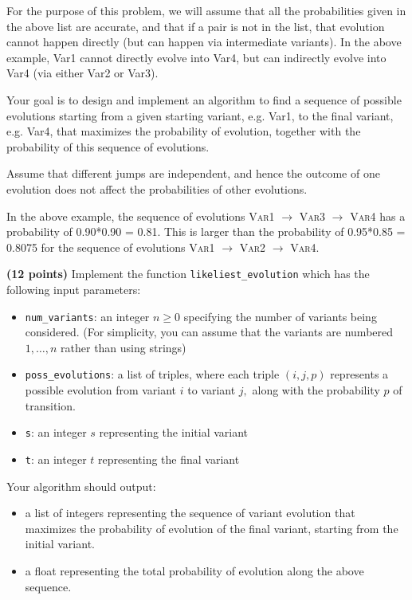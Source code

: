 \documentclass{assignment-373}
\begin{document}
\begin{enumerate}
For the purpose of this problem, we will assume that all the
probabilities given in the above list are accurate, and that if a pair
is not in the list, that evolution cannot happen directly (but can
happen via intermediate variants). In the above example, \textsf{Var1}
cannot directly evolve into \textsf{Var4}, but can indirectly evolve
into \textsf{Var4} (via either \textsf{Var2} or \textsf{Var3}).

Your goal is to design and implement an algorithm to find a sequence
of possible evolutions starting from a given starting variant,
e.g. \textsf{Var1}, to the final variant, e.g. \textsf{Var4}, that
maximizes the probability of evolution, together with the probability
of this sequence of evolutions.

Assume that different jumps are independent, and hence the outcome of
one evolution does not affect the probabilities of other evolutions.

In the above example, the sequence of evolutions \textsc{Var1} $\to$
\textsc{Var3} $\to$ \textsc{Var4} has a probability of 0.90*0.90 =
0.81. This is larger than the probability of 0.95*0.85 = 0.8075 for
the sequence of evolutions \textsc{Var1} $\to$ \textsc{Var2} $\to$
\textsc{Var4}.

\textbf{(12 points)} Implement the function
\texttt{likeliest\_evolution} which has the following input
parameters:
\begin{itemize}
\item \texttt{num\_variants}: an integer $n \ge 0$ specifying the
  number of variants being considered. (For simplicity, you can assume
  that the variants are numbered $1,\ldots,n$ rather than using strings)
\item \texttt{poss\_evolutions}: a list of triples, where each triple
  $(i,j,p)$ represents a possible evolution from variant $i$ to
  variant $j,$ along with the probability $p$ of transition.
\item \texttt{s}: an integer $s$ representing the initial variant
\item \texttt{t}: an integer $t$ representing the final variant
\end{itemize}





Your algorithm should output:
\begin{itemize}
\item a list of integers representing the sequence of variant
  evolution that maximizes the probability of evolution of the final
  variant, starting from the initial variant.
\item a float representing the total probability of evolution along
  the above sequence.
\end{itemize}




\end{enumerate}
\end{document}
